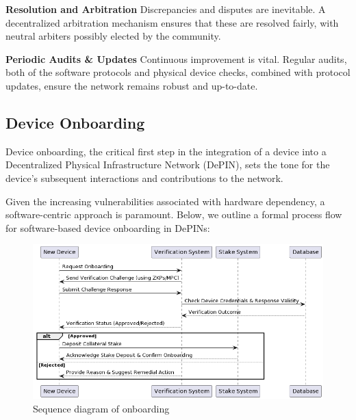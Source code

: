\documentclass{article}
\begin{document}
\textbf{Resolution and Arbitration} Discrepancies and disputes are inevitable. A decentralized arbitration mechanism ensures that these are resolved fairly, with neutral arbiters possibly elected by the community.

\textbf{Periodic Audits \& Updates} Continuous improvement is vital. Regular audits, both of the software protocols and physical device checks, combined with protocol updates, ensure the network remains robust and up-to-date.

\subsection{Device Onboarding}

Device onboarding, the critical first step in the integration of a device into a Decentralized Physical Infrastructure Network (DePIN), sets the tone for the device's subsequent interactions and contributions to the network. 

Given the increasing vulnerabilities associated with hardware dependency, a software-centric approach is paramount. Below, we outline a formal process flow for software-based device onboarding in DePINs:


\begin{figure}[ht]
  \centering
  \includegraphics[scale=0.4]{diagram2}
  \caption{Sequence diagram of onboarding}
\end{figure}
\end{document}
